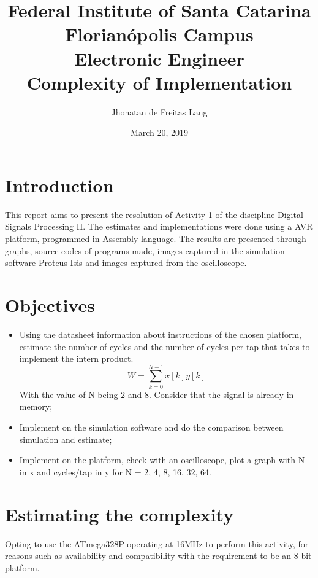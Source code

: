 \documentclass{article}
\title{\vspace{-3cm}Federal Institute of Santa Catarina\\
Florianópolis Campus\\
Electronic Engineer \\
\vspace{7cm}
\textbf{Complexity of Implementation}\\
\vspace{1cm}
}
\author{Jhonatan de Freitas Lang \\
\vspace{8cm}}
\date{March 20, 2019}
\begin{document}
\begin{titlepage}
\clearpage\maketitle
\thispagestyle{empty}
\end{titlepage}
{}
\tableofcontents
\newpage
{} %
\section{Introduction}
This report aims to present the resolution of Activity 1 of the discipline Digital Signals Processing II. 
The estimates and implementations were done using a AVR platform, programmed in Assembly language.  The results are presented through graphs, source codes of programs made, images captured in the simulation software Proteus Isis and images captured from the oscilloscope.

\section{Objectives}
\begin{itemize}
\item Using the datasheet information about instructions of the chosen platform, estimate the number of cycles and the number of cycles per tap that takes to implement the intern product. 
\begin{equation}\label{eq:interProduct}
W = \sum_{k=0}^{N-1} x[k]y[k]
\end{equation}
With the value of N being 2 and 8. Consider that the signal is already in memory;
\item Implement on the simulation software and do the comparison between simulation and estimate;
\item Implement on the platform, check with an oscilloscope, plot a graph with N in x and cycles/tap in y for N = 2, 4, 8, 16, 32, 64.
\end{itemize}
\section{Estimating the complexity}
Opting to use the ATmega328P operating at 16MHz to perform this activity, for reasons such as availability and compatibility with the requirement to be an 8-bit platform.
\end{document}
